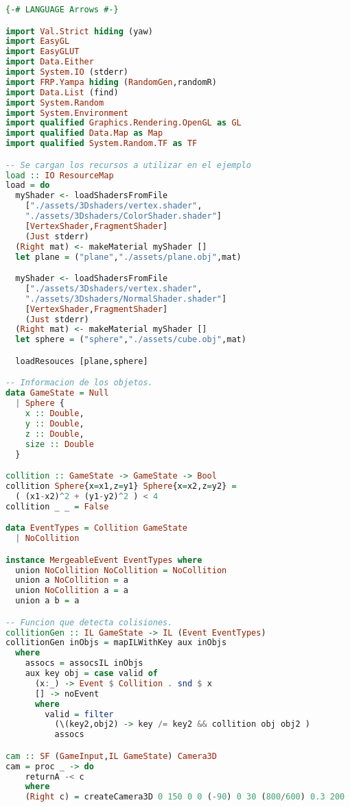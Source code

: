 \begin{lstlisting}[label={Ejemplo2},caption={Ejemplo - Objetos que chocan},language=Haskell]
{-# LANGUAGE Arrows #-}

import Val.Strict hiding (yaw)
import EasyGL
import EasyGLUT
import Data.Either
import System.IO (stderr)
import FRP.Yampa hiding (RandomGen,randomR)
import Data.List (find)
import System.Random
import System.Environment
import qualified Graphics.Rendering.OpenGL as GL
import qualified Data.Map as Map
import qualified System.Random.TF as TF

-- Se cargan los recursos a utilizar en el ejemplo
load :: IO ResourceMap
load = do
  myShader <- loadShadersFromFile
    ["./assets/3Dshaders/vertex.shader",
    "./assets/3Dshaders/ColorShader.shader"]
    [VertexShader,FragmentShader]
    (Just stderr)
  (Right mat) <- makeMaterial myShader []
  let plane = ("plane","./assets/plane.obj",mat)

  myShader <- loadShadersFromFile
    ["./assets/3Dshaders/vertex.shader",
    "./assets/3Dshaders/NormalShader.shader"]
    [VertexShader,FragmentShader]
    (Just stderr)
  (Right mat) <- makeMaterial myShader []
  let sphere = ("sphere","./assets/cube.obj",mat)

  loadResouces [plane,sphere]

-- Informacion de los objetos.
data GameState = Null
  | Sphere {
    x :: Double,
    y :: Double,
    z :: Double,
    size :: Double
  }

collition :: GameState -> GameState -> Bool
collition Sphere{x=x1,z=y1} Sphere{x=x2,z=y2} =
  ( (x1-x2)^2 + (y1-y2)^2 ) < 4
collition _ _ = False

data EventTypes = Collition GameState
  | NoCollition

instance MergeableEvent EventTypes where
  union NoCollition NoCollition = NoCollition
  union a NoCollition = a
  union NoCollition a = a
  union a b = a

-- Funcion que detecta colisiones.
collitionGen :: IL GameState -> IL (Event EventTypes)
collitionGen inObjs = mapILWithKey aux inObjs
  where
    assocs = assocsIL inObjs
    aux key obj = case valid of
      (x:_) -> Event $ Collition . snd $ x
      [] -> noEvent
      where
        valid = filter
          (\(key2,obj2) -> key /= key2 && collition obj obj2 )
          assocs

cam :: SF (GameInput,IL GameState) Camera3D
cam = proc _ -> do
    returnA -< c
    where
    (Right c) = createCamera3D 0 150 0 0 (-90) 0 30 (800/600) 0.3 200


\end{lstlisting}
